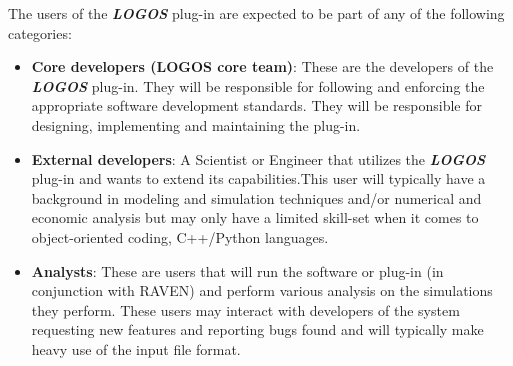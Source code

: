 The users of the \textbf{\textit{LOGOS}} plug-in are expected to be part of any of the
following categories:
\begin{itemize}
  \item \textbf{Core developers (LOGOS core team)}: These are the developers of the
    \textbf{\textit{LOGOS}}  plug-in. They will be responsible for following
    and enforcing the appropriate software development standards. They will be
    responsible for designing, implementing and
    maintaining the plug-in.
  \item \textbf{External developers}: A Scientist or Engineer that utilizes the
    \textbf{\textit{LOGOS}}  plug-in and wants to extend its
    capabilities.This user will typically have a background in modeling and
    simulation techniques and/or numerical and economic analysis but may only have
    a limited skill-set when it comes to object-oriented
    coding, C++/Python languages.
  \item \textbf{Analysts}:  These are users that will run the software or plug-in
    (in conjunction with RAVEN) and perform various analysis on the
    simulations they perform. These users may interact with developers of the system
    requesting new features and reporting bugs found
    and will typically make heavy use of the input file format.
\end{itemize}


